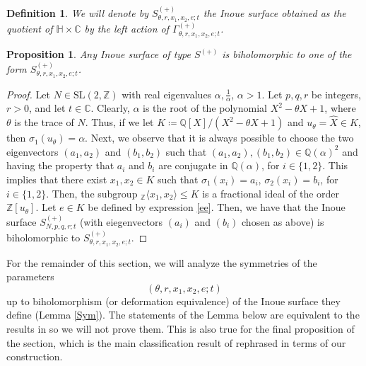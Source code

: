 \documentclass[12pt]{amsart}
\newtheorem{definition}{Definition}[section]
\newtheorem{proposition}{Proposition}[section]
\newcommand{\Z}{\mathbb{Z}}
\newcommand{\C}{\mathbb{C}}
\newcommand{\Q}{\mathbb{Q}}
\newcommand{\HH}{\mathbb{H}}
\begin{document}
\begin{definition}\label{quo}
We will denote by $S^{(+)}_{\theta,r,x_1,x_2,e;t}$ the Inoue surface obtained as the quotient of $\HH \times \C$ by the left action of $\Gamma_{\theta,r,x_1,x_2,e;t}^{(+)}$.
\end{definition}

\begin{proposition} \label{p2}
Any Inoue surface of type $S^{(+)}$ is biholomorphic to one of the form $S^{(+)}_{\theta,r,x_1,x_2,e;t}$.
\end{proposition}

\begin{proof}
Let $N \in \text{SL}(2,\Z)$ with real eigenvalues $\alpha, \frac{1}{\alpha}$, $\alpha >1$. Let $p,q,r$ be integers, $r>0$, and let $t\in \C$. Clearly, $\alpha$ is the root of the polynomial $X^2-\theta X+1$, where $\theta$ is the trace of $N$. Thus, if we let $K\coloneq \Q[X]/(X^2 -\theta X + 1)$ and $u_\theta = \hat{X} \in K$, then $\sigma_1(u_\theta) = \alpha$. Next, we observe that it is always possible to choose the two eigenvectors $(a_1,a_2)$ and $(b_1,b_2)$ such that $(a_1,a_2), (b_1,b_2) \in \Q(\alpha)^2$ and having the property that $a_i$ and $b_i$ are conjugate in $\Q(\alpha)$, for $i\in \{1,2\}$. This implies that there exist $x_1,x_2 \in K$ such that $\sigma_1(x_i)=a_i$, $\sigma_2(x_i)=b_i$, for $i\in\{1,2\}$. Then, the subgroup $_\Z\langle x_1,x_2 \rangle \leq K$ is a fractional ideal of the order $\Z[u_\theta]$. Let $e\in K$ be defined by expression \ref{ee}. Then, we have that the Inoue surface $S^{(+)}_{N,p,q,r;t}$ (with eiegenvectors $(a_i)$ and $(b_i)$ chosen as above) is biholomorphic to $S^{(+)}_{\theta,r,x_1,x_2,e;t}$.
\end{proof}

\noindent
For the remainder of this section, we will analyze the symmetries of the parameters 
$$(\theta, r, x_1, x_2, e; t)$$
up to biholomorphism (or deformation equivalence) of the Inoue surface they define (Lemma \ref{Sym}). The statements of the Lemma below are equivalent to the results in \cite{KT} so we will not prove them. This is also true for the final proposition of the section, which is the main classification result of \cite{KT} rephrased in terms of our construction.
\end{document}
